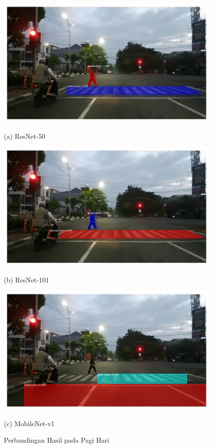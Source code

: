 \begin{figure}[h]
	\centering
	\begin{minipage}[b]{0.3\textwidth}
		\includegraphics[width=\textwidth]{gambar/hasil/resnet-50_fajar_800.png}
		\caption*{(a) ResNet-50}
	\end{minipage}
	\hfill
	\begin{minipage}[b]{0.3\textwidth}
		\includegraphics[width=\textwidth]{gambar/hasil/resnet-101_fajar_800.png}
		\caption*{(b) ResNet-101}
	\end{minipage}
	\hfill
	\begin{minipage}[b]{0.3\textwidth}
		\includegraphics[width=\textwidth]{gambar/fajar-frame800-mobilenetv1.png}
		\caption*{(c) MobileNet-v1}
	\end{minipage}
	\caption{{Perbandingan Hasil pada Pagi Hari}}
	\label{fig:comparasion-morning}
\end{figure}

